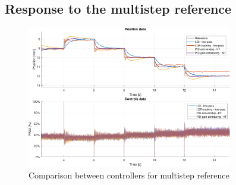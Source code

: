 \subsection{Response to the multistep reference}
\label{subsec:plot_multistep}

\begin{figure}[H]
    \centering
    \includegraphics[width=0.8\textwidth]{./img/MATLAB/results/multisteps_stairs_star_star.pdf}
    \caption{Comparison between controllers for multistep reference}
    \label{fig:multistep_1mm}
\end{figure}

